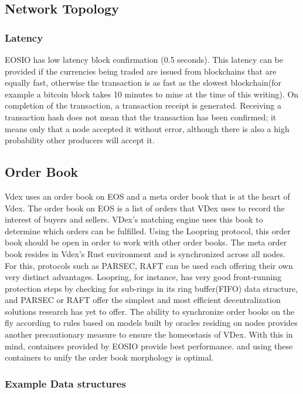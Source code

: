 \documentclass[]{article}
\begin{document}
{\subsection{Network Topology}


\subsubsection{Latency}    
EOSIO has low latency block confirmation (0.5 seconds).\cite{3}
This latency can be provided if the currencies being traded are issued from blockchains that are equally fast, otherwise the transaction is as fast as the slowest blockchain(for example a bitcoin block takes 10 minutes to mine at the time of this writing). 
On completion of the transaction, a transaction receipt is generated. 
Receiving a transaction hash does not mean that the transaction has been confirmed; it means only that a node accepted it without error, although there is also a high probability other producers will accept it. 

\subsection{Order Book}
Vdex uses an order book on EOS and a meta order book that is at the heart of Vdex. 
The order book on EOS is a list of orders that VDex uses to record the interest of buyers and sellers. 
VDex's matching engine uses this book to determine which orders can be fulfilled.
Using the Loopring protocol, this order book should be open in order to work with other order books.\cite{7}
The meta order book resides in Vdex's Rust environment and is synchronized across all nodes.
For this, protocols such as PARSEC, RAFT can be used each offering their own very distinct advantages. Loopring, for instance, has very good front-running protection steps by checking for sub-rings in its ring buffer(FIFO) data structure, and PARSEC or RAFT offer the simplest and most efficient decentralization solutions research has yet to offer.
The ability to synchronize order books on the fly according to rules based on models built by oracles residing on nodes provides another precautionary measure to ensure the homeostasis of VDex.
With this in mind, containers provided by EOSIO provide best performance.\cite{25} and
using these containers to unify the order book morphology is optimal.


\subsubsection{Example Data structures}

}
\end{document}
